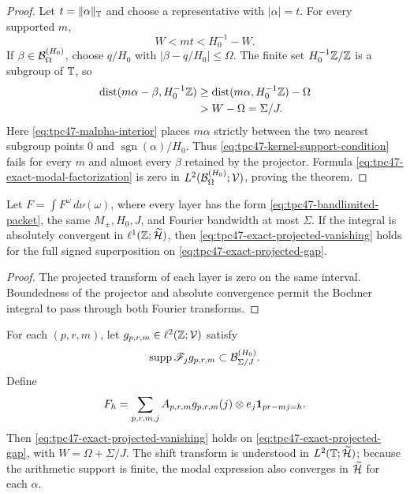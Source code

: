 \begin{proof}
Let \(t=\|\alpha\|_{\mathbb T}\) and choose a representative with
\(|\alpha|=t\).  For every supported \(m\),
\begin{equation}
 W<mt<H_0^{-1}-W.
 \label{eq:tpc47-malpha-interior}
\end{equation}
If \(\beta\in\mathcal B_{\Omega}^{(H_0)}\), choose
\(q/H_0\) with
\(|\beta-q/H_0|\le\Omega\).  The finite set
\(H_0^{-1}\mathbb Z/\mathbb Z\) is a subgroup of \(\mathbb T\), so
\begin{align}
 \operatorname{dist}
 (m\alpha-\beta,H_0^{-1}\mathbb Z)
 &\ge
 \operatorname{dist}(m\alpha,H_0^{-1}\mathbb Z)-\Omega
 \notag\\
 &>W-\Omega=\Sigma/J.
 \label{eq:tpc47-band-distance-lower}
\end{align}
Here \eqref{eq:tpc47-malpha-interior} places \(m\alpha\) strictly
between the two nearest subgroup points \(0\) and
\(\operatorname{sgn}(\alpha)/H_0\).  Thus
\eqref{eq:tpc47-kernel-support-condition} fails for every
\(m\) and almost every \(\beta\) retained by the projector.
Formula \eqref{eq:tpc47-exact-modal-factorization} is zero in
\(L^2(\mathcal B_{\Omega}^{(H_0)};\mathcal V)\), proving the theorem.
\end{proof}

\begin{corollary}
\label{cor:tpc47-projective-exact-gap}
Let \(F=\int F^\omega\,d\nu(\omega)\), where every layer has the
form \eqref{eq:tpc47-bandlimited-packet}, the same
\(M_\pm,H_0,J\), and Fourier bandwidth at most \(\Sigma\).  If the
integral is absolutely convergent in
\(\ell^1(\mathbb Z;\widetilde{\mathcal H})\), then
\eqref{eq:tpc47-exact-projected-vanishing} holds for the full signed
superposition on \eqref{eq:tpc47-exact-projected-gap}.
\end{corollary}

\begin{proof}
The projected transform of each layer is zero on the same interval.
Boundedness of the projector and absolute convergence permit the
Bochner integral to pass through both Fourier transforms.
\end{proof}

\begin{corollary}
\label{cor:tpc47-vector-coefficient-band}
For each \((p,r,m)\), let
\(g_{p,r,m}\in\ell^2(\mathbb Z;\mathcal V)\) satisfy
\begin{equation}
 \operatorname{supp}\mathscr F_jg_{p,r,m}
 \subset\mathcal B_{\Sigma/J}^{(H_0)}.
 \label{eq:tpc47-vector-profile-support}
\end{equation}
Define
\begin{equation}
 F_h=\sum_{p,r,m,j}A_{p,r,m}g_{p,r,m}(j)\otimes e_j
 \mathbf 1_{pr-mj=h}.
 \label{eq:tpc47-vector-profile-packet}
\end{equation}
Then \eqref{eq:tpc47-exact-projected-vanishing} holds on
\eqref{eq:tpc47-exact-projected-gap}, with
\(W=\Omega+\Sigma/J\).  The shift transform is understood in
\(L^2(\mathbb T;\widetilde{\mathcal H})\); because the arithmetic support is finite,
the modal expression also converges in \(\widetilde{\mathcal H}\) for each
\(\alpha\).
\end{corollary}


